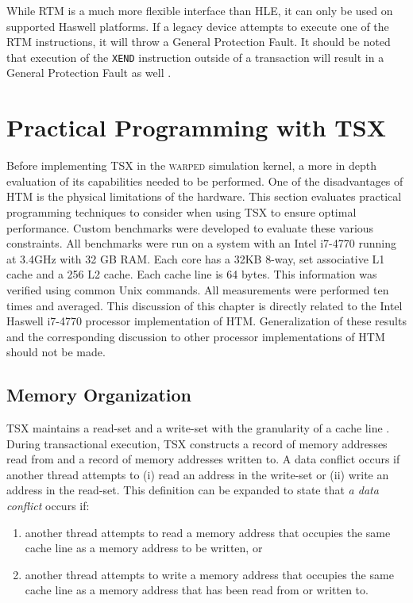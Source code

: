 \documentclass[11pt]{book}
\begin{document}
While RTM is a much more flexible interface than HLE, it can only be used on supported
Haswell platforms.  If a legacy device attempts to execute one of the RTM instructions, it
will throw a General Protection Fault.  It should be noted that execution of the
\texttt{XEND} instruction outside of a transaction will result in a General Protection
Fault as well \cite{intel_opt_man}.


\chapter{Practical Programming with TSX}

Before implementing TSX in the \textsc{warped} simulation kernel, a more in depth
evaluation of its capabilities needed to be performed.  One of the disadvantages of HTM is
the physical limitations of the hardware.  This section evaluates practical programming
techniques to consider when using TSX to ensure optimal performance.  Custom benchmarks
were developed to evaluate these various constraints.  All benchmarks were run on a system
with an Intel i7-4770 running at 3.4GHz with 32 GB RAM.  Each core has a 32KB 8-way, set
associative L1 cache and a 256 L2 cache.  Each cache line is 64 bytes.  This information
was verified using common Unix commands.  All measurements were performed ten times and
averaged.  This discussion of this chapter is directly related to the Intel Haswell
i7-4770 processor implementation of HTM.  Generalization of these results and the
corresponding discussion to other processor implementations of HTM should not be made. 

\section{Memory Organization}

TSX maintains a read-set and a write-set with the granularity of a cache line
\cite{intel_prog_ref}.  During transactional execution, TSX constructs a record of memory
addresses read from and a record of memory addresses written to.  A data conflict occurs
if another thread attempts to (i) read an address in the write-set or (ii) write an
address in the read-set.  This definition can be expanded to state that \emph{a data
  conflict} occurs if:

\vspace*{-\bigskipamount}
\begin{singlespace}
\begin{enumerate}
  \item another thread attempts to read a memory address that occupies the same cache line
    as a memory address to be written, or
  \item another thread attempts to write a memory address that occupies the same cache
    line as a memory address that has been read from or written to.
\end{enumerate}
\end{singlespace}
\end{document}
